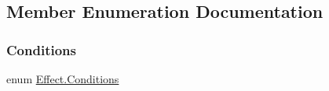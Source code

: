 \subsection{Member Enumeration Documentation}
\mbox{\label{class_effect_ab13a718053e330a11f9f66a9b16f4686}} 
\subsubsection{\texorpdfstring{Conditions}{Conditions}}
{\footnotesize\ttfamily enum \mbox{\hyperlink{class_effect_ab13a718053e330a11f9f66a9b16f4686}{Effect.\+Conditions}}\hspace{0.3cm}{\ttfamily [strong]}}


